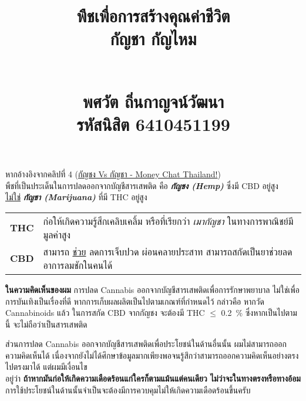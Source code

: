 \documentclass{article}
\title{\flushleft\Large พืชเพื่อการสร้างคุณค่าชีวิต\\
\Huge\textbf{กัญชา กัญไหม}\\
\rule{0em}{1ex}\\
\normalsize พศวัต ถิ่นกาญจน์วัฒนา\\
รหัสนิสิต 6410451199
\vspace{-8ex}}
\author{}
\date{}
\begin{document}
\maketitle
\sloppy\flushleft
หากอ้างอิงจากคลิปที่ 4 (\href{https://youtu.be/ARtuiHrqm5Y}{กัญชง Vs กัญชา - Money Chat Thailand!})\\
พืชที่เป็นประเด็นในการปลดออกจากบัญชีสารเสพติด คือ \textbf{\textit{กัญชง (Hemp)}} ซึ่งมี CBD อยู่สูง\\
\underline{ไม่ใช่} \textbf{\textit{กัญชา (Marijuana)}} ที่มี THC อยู่สูง

\rule{0em}{1ex}

\begin{tabular}{c l}
\textbf{THC}    & ก่อให้เกิดความรู้สึกเคลิบเคลิ้ม หรือที่เรียกว่า \textit{เมากัญชา} ในทางการพาณิชย์มีมูลค่าสูง\\
\textbf{CBD}    & สามารถ \underline{ช่วย} ลดการเจ็บปวด ผ่อนคลายประสาท สามารถสกัดเป็นยาช่วยลดอาการลมชักในคนได้
\end{tabular}

\rule{0em}{1ex}

\textbf{ในความคิดเห็นของผม} การปลด Cannabis ออกจากบัญชีสารเสพติดเพื่อการรักษาพยาบาล ไม่ใช่เพื่อการบันเทิงเป็นเรื่องที่ดี
หากการเก็บผลผลิตเป็นไปตามเกณฑ์ที่กำหนดไว้ กล่าวคือ หากวัด Cannabinoids แล้ว ในการสกัด CBD จากกัญชง
จะต้องมี THC $\le$ 0.2~\% ซึ่งหากเป็นไปตามนี้ จะไม่ถือว่าเป็นสารเสพติด

\rule{0em}{1ex}

ส่วนการปลด Cannabis ออกจากบัญชีสารเสพติดเพื่อประโยชน์ในด้านอื่นนั้น ผมไม่สามารถออกความคิดเห็นได้
เนื่องจากยังไม่ได้ศึกษาข้อมูลมากเพียงพอจนรู้สึกว่าสามารถออกความคิดเห็นอย่างตรงไปตรงมาได้ แต่ผมมีเงื่อนไข\\
อยู่ว่า \textbf{ถ้าหากมันก่อให้เกิดความเดือดร้อนแก่ใครก็ตามแม้นแต่คนเดียว ไม่ว่าจะในทางตรงหรือทางอ้อม}\\
การใช้ประโยชน์ในด้านนั้นจำเป็นจะต้องมีการควบคุมไม่ให้เกิดความเดือดร้อนขึ้นครับ

\rule{0em}{6ex}

\end{document}
